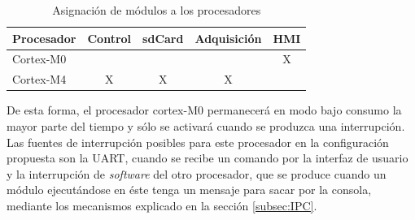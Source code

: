 \begin{table}[ht]
\centering
\caption{Asignación de módulos a los procesadores}
\label{tab:modulos}
\begin{tabular}{lcccc}
\toprule
\textbf{Procesador} & \textbf{Control} & \textbf{sdCard} & \textbf{Adquisición} & \textbf{HMI} \\ \midrule
Cortex-M0			&                  &                 &                      & X            \\
Cortex-M4   		& X                & X               & X                    &              \\
\bottomrule
\end{tabular}
\end{table}

De esta forma, el procesador cortex-M0 permanecerá en modo bajo consumo la mayor parte del tiempo y sólo se activará cuando se produzca una interrupción.  Las fuentes de interrupción posibles para este procesador en la configuración propuesta son la UART, cuando se recibe un comando por la interfaz de usuario y la interrupción de \textit{software} del otro procesador, que se produce cuando un módulo ejecutándose en éste tenga un mensaje para sacar por la consola, mediante los mecanismos explicado en la sección \ref{subsec:IPC}.

